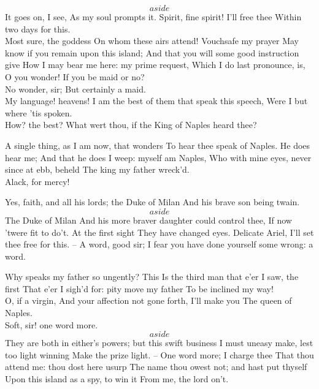 \documentclass[11pt]{book}
\begin{document}
\1	\[aside\] It goes on, I see,
	As my soul prompts it. Spirit, fine spirit! I'll free thee
	Within two days for this. \\

\3	Most sure, the goddess
	On whom these airs attend! Vouchsafe my prayer
	May know if you remain upon this island;
	And that you will some good instruction give
	How I may bear me here: my prime request,
	Which I do last pronounce, is, O you wonder!
	If you be maid or no? \\

\2	No wonder, sir;
	But certainly a maid. \\

\3	My language! heavens!
	I am the best of them that speak this speech,
	Were I but where 'tis spoken. \\

\1	How? the best?
	What wert thou, if the King of Naples heard thee?

\3	A single thing, as I am now, that wonders
	To hear thee speak of Naples. He does hear me;
	And that he does I weep: myself am Naples,
	Who with mine eyes, never since at ebb, beheld
	The king my father wreck'd. \\

\2	Alack, for mercy!

\3	Yes, faith, and all his lords; the Duke of Milan
	And his brave son being twain. \\

\1	\[aside\]	The Duke of Milan
	And his more braver daughter could control thee,
	If now 'twere fit to do't. At the first sight
	They have changed eyes. Delicate Ariel,
	I'll set thee free for this. --  A word, good sir;
	I fear you have done yourself some wrong: a word.

\2	Why speaks my father so ungently? This
	Is the third man that e'er I saw, the first
	That e'er I sigh'd for: pity move my father
	To be inclined my way! \\

\3	O, if a virgin,
	And your affection not gone forth, I'll make you
	The queen of Naples. \\

\1	Soft, sir! one word more.
	\[aside\] They are both in either's powers; but this swift business
	I must uneasy make, lest too light winning
	Make the prize light. -- One word more; I charge thee
	That thou attend me: thou dost here usurp
	The name thou owest not; and hast put thyself
	Upon this island as a spy, to win it
	From me, the lord on't. \\
\end{document}
